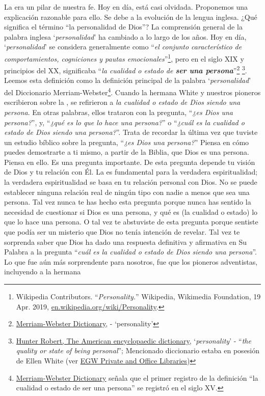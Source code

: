 La  era un pilar de nuestra fe. Hoy en día, está casi olvidada. Proponemos una explicación razonable para ello. Se debe a la evolución de la lengua inglesa. ¿Qué significa el término “la personalidad de Dios”? La comprensión general de la palabra inglesa ‘\textit{personalidad}’ ha cambiado a lo largo de los años. Hoy en día, ‘\textit{personalidad}’ se considera generalmente como “\textit{el conjunto característico de comportamientos, cogniciones y pautas emocionales}”\footnote{Wikipedia Contributors. “\textit{Personality.}” Wikipedia, Wikimedia Foundation, 19 Apr. 2019, \href{https://en.wikipedia.org/wiki/Personality}{en.wikipedia.org/wiki/Personality}.}, pero en el siglo XIX y principios del XX, significaba “\textit{la cualidad o estado de \textbf{ser una persona}}”\footnote{\href{https://www.merriam-webster.com/dictionary/personality}{Merriam-Webster Dictionary}, - ‘personality’} \footnote{\href{https://babel.hathitrust.org/cgi/pt?id=mdp.39015050663213&view=1up&seq=780}{Hunter Robert, The American encyclopaedic dictionary}, ‘\textit{personality}’ - “\textit{the quality or state of being personal}”; Mencionado diccionario estaba en posesión de Ellen White (ver \href{https://repo.adventistdigitallibrary.org/PDFs/adl-22/adl-22251050.pdf?_ga=2.116010630.1065317374.1621993520-1506151612.1617862694&fbclid=IwAR3vwmp8jxtnpPEKv0KD9mCv8dJpmRGoyIXW0CkbQAjbU0h6YaBGqhgBzbk}{EGW Private and Office Libraries})}. Leemos esta definición como la definición principal de la palabra ‘\textit{personalidad}’ del Diccionario Merriam-Webster\footnote{\href{https://www.merriam-webster.com/dictionary/personality\#word-history}{Merriam-Webster Dictionary} señala que el primer registro de la definición “la cualidad o estado de ser una persona” se registró en el siglo XV.}. Cuando la hermana White y nuestros pioneros escribieron sobre la , se refirieron a \textit{la cualidad o estado de Dios siendo una persona}. En otras palabras, ellos trataron con la pregunta, “\textit{¿es Dios una persona?}”, y, “\textit{¿qué es lo que lo hace una persona?}” o “\textit{¿cuál es la cualidad o estado de Dios siendo una persona?}”. Trata de recordar la última vez que tuviste un estudio bíblico sobre la pregunta, “\textit{¿es Dios una persona?}” Piensa en cómo puedes demostrarte a ti mismo, a partir de la Biblia, que Dios es una persona. Piensa en ello. Es una pregunta importante. De esta pregunta depende tu visión de Dios y tu relación con Él. La  es fundamental para la verdadera espiritualidad; la verdadera espiritualidad se basa en tu relación personal con Dios. No se puede establecer ninguna relación real de ningún tipo con nadie a menos que sea una persona. Tal vez nunca te has hecho esta pregunta porque nunca has sentido la necesidad de cuestionar si Dios es una persona, y qué es (la cualidad o estado) lo que lo hace una persona. O tal vez te abstuviste de esta pregunta porque sentiste que podía ser un misterio que Dios no tenía intención de revelar. Tal vez te sorprenda saber que Dios ha dado una respuesta definitiva y afirmativa en Su Palabra a la pregunta “\textit{cuál es la cualidad o estado de Dios siendo una persona}”. Lo que fue aún más sorprendente para nosotros, fue que los pioneros adventistas, incluyendo a la hermana 